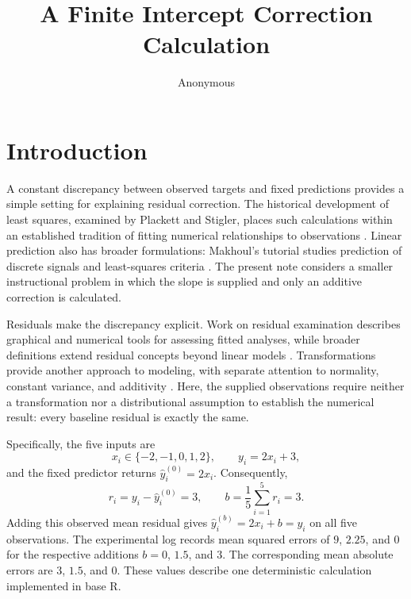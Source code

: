 \documentclass[11pt]{article}
\title{A Finite Intercept Correction Calculation}
\author{Anonymous}
\date{}
\begin{document}
\maketitle
\begin{abstract}
\end{abstract}
\section{Introduction}

A constant discrepancy between observed targets and fixed predictions provides a simple setting for explaining residual correction. The historical development of least squares, examined by Plackett and Stigler, places such calculations within an established tradition of fitting numerical relationships to observations \cite{Plackett1972StudiesHistory,Stigler1981GaussInvention}. Linear prediction also has broader formulations: Makhoul's tutorial studies prediction of discrete signals and least-squares criteria \cite{Makhoul1975LinearPrediction}. The present note considers a smaller instructional problem in which the slope is supplied and only an additive correction is calculated.

Residuals make the discrepancy explicit. Work on residual examination describes graphical and numerical tools for assessing fitted analyses, while broader definitions extend residual concepts beyond linear models \cite{Anscombe1963ExaminationAnalysis,Cox1968GeneralDefinition}. Transformations provide another approach to modeling, with separate attention to normality, constant variance, and additivity \cite{Box1964AnalysisTransformations}. Here, the supplied observations require neither a transformation nor a distributional assumption to establish the numerical result: every baseline residual is exactly the same.

Specifically, the five inputs are
\[
x_i\in\{-2,-1,0,1,2\},\qquad y_i=2x_i+3,
\]
and the fixed predictor returns $\widehat{y}^{(0)}_i=2x_i$. Consequently,
\[
r_i=y_i-\widehat{y}^{(0)}_i=3,\qquad
b=\frac{1}{5}\sum_{i=1}^{5}r_i=3.
\]
Adding this observed mean residual gives
$\widehat{y}^{(b)}_i=2x_i+b=y_i$ on all five observations. The experimental log records mean squared errors of $9$, $2.25$, and $0$ for the respective additions $b=0$, $1.5$, and $3$. The corresponding mean absolute errors are $3$, $1.5$, and $0$. These values describe one deterministic calculation implemented in base R.
\end{document}
